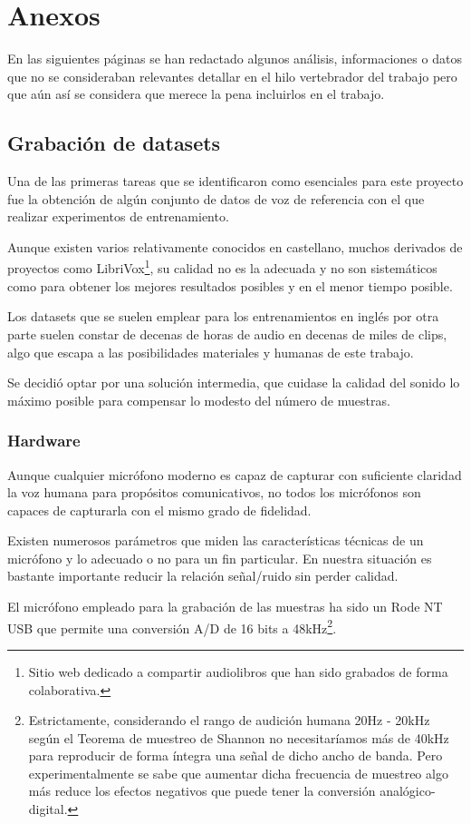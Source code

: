 \section{Anexos}

En las siguientes páginas se han redactado algunos análisis, informaciones o datos que no se consideraban relevantes detallar en el hilo vertebrador del trabajo pero que aún así se considera que merece la pena incluirlos en el trabajo.


\newpage 
\subsection{Grabación de datasets}
\label{Grabación de datasets}

Una de las primeras tareas que se identificaron como esenciales para este proyecto fue la obtención de algún conjunto de datos de voz de referencia con el que realizar experimentos de entrenamiento.

Aunque existen varios relativamente conocidos en castellano, muchos derivados de proyectos como LibriVox\footnote{Sitio web dedicado a compartir audiolibros que han sido grabados de forma colaborativa.}, su calidad no es la adecuada y no son sistemáticos como para obtener los mejores resultados posibles y en el menor tiempo posible. 

Los datasets que se suelen emplear para los entrenamientos en inglés por otra parte suelen constar de decenas de horas de audio en decenas de miles de clips, algo que escapa a las posibilidades materiales y humanas de este trabajo.

Se decidió optar por una solución intermedia, que cuidase la calidad del sonido lo máximo posible para compensar lo modesto del número de muestras.

\subsubsection{Hardware}

Aunque cualquier micrófono moderno es capaz de capturar con suficiente claridad la voz humana para propósitos comunicativos, no todos los micrófonos son capaces de capturarla con el mismo grado de fidelidad.

Existen numerosos parámetros que miden las características técnicas de un micrófono y lo adecuado o no para un fin particular. En nuestra situación es bastante importante reducir la relación señal/ruido sin perder calidad.

El micrófono empleado para la grabación de las muestras ha sido un Rode NT USB que permite una conversión A/D de 16 bits a 48kHz\footnote{Estrictamente, considerando el rango de audición humana 20Hz - 20kHz según el Teorema de muestreo de Shannon no necesitaríamos más de 40kHz para reproducir de forma íntegra una señal de dicho ancho de banda. Pero experimentalmente se sabe que aumentar dicha frecuencia de muestreo algo más reduce los efectos negativos que puede tener la conversión analógico-digital.}.

